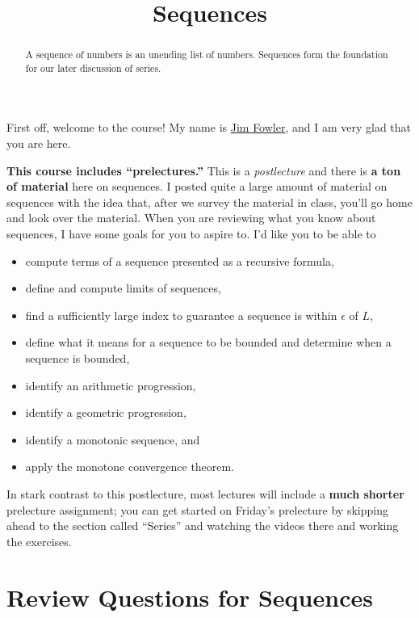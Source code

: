 \documentclass{ximera}
\title{Sequences}
\begin{document}
\begin{abstract}
  A sequence of numbers is an unending list of numbers.  Sequences form the foundation for our later discussion of series.
\end{abstract}

\maketitle

First off, welcome to the course!  My name is \href{http://kisonecat.com/}{Jim Fowler}, and I am very glad that you are here.

\textbf{This course includes ``prelectures.''}  This is a \textit{postlecture} and there is \textbf{a ton
  of material} here on sequences.  I posted quite a large amount of
material on sequences with the idea that, after we survey the material
in class, you'll go home and look over the material.  When you
are reviewing what you know about sequences, I have some goals for you
to aspire to.  I'd like you to be able to
\begin{itemize}
\item compute terms of a sequence presented as a recursive formula,
\item define and compute limits of sequences,
\item find a sufficiently large index to guarantee a sequence is within \(\epsilon\) of \(L\),
\item define what it means for a sequence to be bounded and determine when a sequence is bounded,
\item identify an arithmetic progression,
\item identify a geometric progression,
\item identify a monotonic sequence, and
\item apply the monotone convergence theorem.
\end{itemize}
In stark contrast to this postlecture, most lectures will include a
\textbf{much shorter} prelecture assignment; you can get started on
Friday's prelecture by skipping ahead to the section called ``Series''
and watching the videos there and working the exercises.



\section{Review Questions for Sequences}
\end{document}
